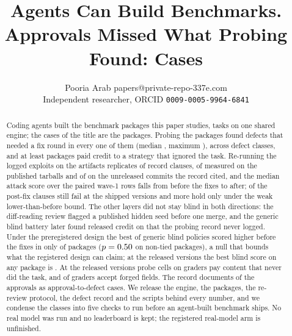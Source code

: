\documentclass[twoside,11pt]{article}
\begin{document}
\title{Agents Can Build Benchmarks. Approvals Missed What Probing Found: \suitePackages{} Cases}
\author{\name Pooria Arab \email papers@private-repo-337e.com \\
       \addr Independent researcher, ORCID \texttt{0009-0005-9964-6841}}

\maketitle

\begin{abstract}
Coding agents built the \suitePackages{} benchmark packages this paper studies, \suiteTasks{} tasks on one shared engine; the \suitePackages{} cases of the title are the packages. Probing the packages found defects that needed a fix round in every one of them (median \reviewRoundsMedian{}, maximum \reviewRoundsMax{}), across  defect classes, and at least  packages paid credit to a strategy that ignored the task. Re-running the logged exploits on the artifacts replicates \expExplReplicated{} of \expExplRecordClauses{} record clauses, \expExplReplReleased{} of \expExplRecordReleased{} measured on the published tarballs and \expExplReplCommit{} of \expExplRecordCommit{} on the unreleased commits the record cited, and the median attack score over the \expExplAtkPairs{} paired wave-1 rows falls from \expExplAtkMedianOldPaired{} before the fixes to \expExplAtkMedianNewPaired{} after; \expExplFixFails{} of the \expExplPostfixClauses{} post-fix clauses still fail at the shipped versions and \expExplFixHoldsWeak{} more hold only under the weak lower-than-before bound. The other layers did not stay blind in both directions: the diff-reading review flagged a published hidden seed before one merge, and the generic blind battery later found released credit on \expTrivialReleasedMaxPkgs{} that the probing record never logged. Under the preregistered design the best of \trivialPolicies{} generic blind policies scored higher before the fixes in only \trivialHigherOld{} of \trivialPackages{} packages ($p = 0.50{}$ on \trivialSignN{} non-tied packages), a null that bounds what the registered design can claim; at the released versions the best blind score on any package is \expTrivialReleasedMax{}. At the released versions \expProbesCreditFailCells{} probe cells on \expProbesCreditFailPkgCount{} graders pay content that never did the task, and \expProbesForgedAccepted{} of \expPackages{} graders accept forged fields. The record documents \approvalDefectCases{} of the \councilMergedApproved{} approvals as approval-to-defect cases. We release the engine, the packages, the re-review protocol, the defect record and the scripts behind every number, and we condense the classes into five checks to run before an agent-built benchmark ships. No real model was run and no leaderboard is kept; the registered real-model arm is unfinished.
\end{abstract}
\end{document}

